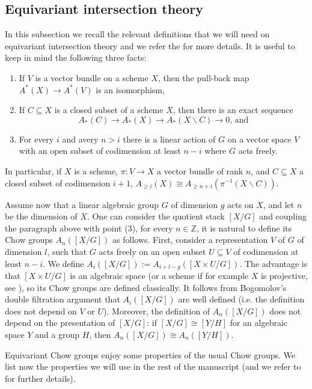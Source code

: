 \documentclass[11pt]{amsart}
\theoremstyle{definition}
\theoremstyle{remark}
\begin{document}
\subsection{Equivariant intersection theory}\label{subsection facts on equivariant chow}In this subsection we recall the relevant definitions that we will need on equivariant intersection theory and we refer the \cite{EG98} for more details. It is useful to keep in mind the following three facts:
\begin{enumerate}
\item If $V$ is a vector bundle on a scheme $X$, then the pull-back map $A^*(X)\to A^*(V)$ is an isomorphism,
\item If $C\subseteq X$ is a closed subset of a scheme $X$, then there is an exact sequence $$A_*(C)\to A_*(X) \to A_*(X\smallsetminus C) \to 0 \text{, and}$$
\item For every $i$ and avery $n>i$ there is a linear action of $G$ on a vector space $V$ with an open subset of codimension at least $n-i$ where $G$ acts freely.
\end{enumerate}

In particular, if $X$ is a scheme, $\pi:V\to X$ a vector bundle of rank $n$,  and $C\subseteq X$ a closed subset of codimension $i+1$, $A_{\ge i}(X) \cong A_{\ge n+ i}(\pi^{-1}(X\smallsetminus C))$.

Assume now that a linear algebraic group $G$ of dimension $g$ acts on $X$, and let $n$ be the dimension of $X$.
One can consider the quotient stack $[X/G]$ and coupling the paragraph above with point (3), for every $n\in \mathbb{Z}$,  it
is natural to define its Chow groups $A_n([X/G])$ as follows.  First, consider a representation $V$ of $G$ of dimension $l$, such that $G$ acts freely on an open subset $U\subseteq V$ of codimension at least $n-i$.  We define $A_i([X/G]) := A_{i + l -g}([X\times U /G])$.
The advantage is that $[X\times U /G]$ is an algebraic space (or a scheme if for example $X$ is projective, see \cite[Proposition 23]{EG98}), so its Chow groups are defined classically. It follows from Bogomolov's double filtration argument that $A_i([X/G])$ are well defined (i.e. the definition does not depend on $V$ or $U$). Moreover, the definition of $A_n([X/G])$ does not depend on the presentation of $[X/G]$: if $[X/G]\cong [Y/H]$ for an algebraic space $Y$ and a group $H$, then $A_n([X/G]) \cong A_n([Y/H])$.


Equivariant Chow groups enjoy some properties of the usual Chow groups. We list now the properties we will use in the rest of the manuscript (and we refer to \cite{EG98} for further details).
\end{document}
